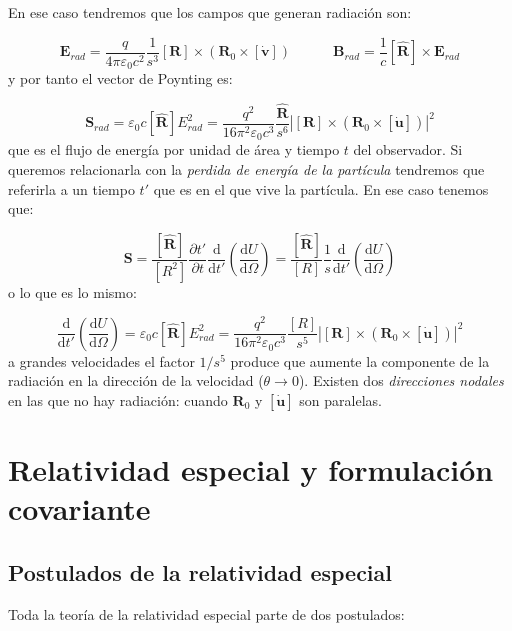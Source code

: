 \documentclass[12pt,a4paper]{article}
\newcommand{\parentesis}[1]{\left( #1  \right)}
\newcommand{\parciales}[2]{\frac{\partial #1}{\partial #2}}
\newcommand{\derivadas}[2]{\frac{\D #1}{\D #2}}
\newcommand{\D}{\mathrm{d}}
\newcommand{\tquad}{\quad \quad \quad}
\newcommand{\Bn}{\mathbf{B}}
\newcommand{\En}{\mathbf{E}}
\newcommand{\vn}{\mathbf{v}}
\newcommand{\Sn}{\mathbf{S}}
\newcommand{\un}{\mathbf{u}}
\newcommand{\Rn}{\mathbf{R}}
\newcommand{\hnR}{\hat{\mathbf{R}}}
\numberwithin{equation}{section}
\numberwithin{figure}{section}
\begin{document}
En ese caso tendremos que los campos que generan radiación son:

\begin{equation}
\En_{rad} = \dfrac{q}{4 \pi \varepsilon_0 c^2 } \dfrac{1}{s^3} [\Rn] \times (\Rn_0 \times [\dot{\vn}] ) \tquad \Bn_{rad} = \dfrac{1}{c} [\hnR] \times \En_{rad}
\end{equation}
y por tanto el vector de Poynting es:

\begin{equation}
\Sn_{rad} = \varepsilon_0 c [\hnR] E^2_{rad} = \dfrac{q^2}{16 \pi^2 \varepsilon_0 c^3} \dfrac{\hnR}{s^6} \left|[{\Rn}]\times(\Rn_0 \times [\dot{\un}]) \right|^2
\end{equation}
que es el flujo de energía por unidad de área y tiempo $t$ del observador. Si queremos relacionarla con la \textit{perdida de energía de la partícula} tendremos que referirla a un tiempo $t'$ que es en el que vive la partícula. En ese caso tenemos que:

\begin{equation}
\Sn = \dfrac{[\hnR]}{[R^2]} \parciales{t'}{t} \dfrac{\D}{\D t'} \parentesis{\derivadas{U}{\Omega}} = \dfrac{[\hnR]}{[R]} \dfrac{1}{s} \dfrac{\D}{\D t'} \parentesis{\derivadas{U}{\Omega}}
\end{equation}
o lo que es lo mismo:

\begin{equation}
\dfrac{\D}{\D t'} \parentesis{\derivadas{U}{\Omega}} = \varepsilon_0 c [\hnR] E^2_{rad} = \dfrac{q^2}{16 \pi^2 \varepsilon_0 c^3} \dfrac{[R]}{s^5} \left|[{\Rn}]\times(\Rn_0 \times [\dot{\un}]) \right|^2
\end{equation}
a grandes velocidades el factor $1/s^5$ produce que aumente la componente de la radiación en la dirección de la velocidad ($\theta \rightarrow 0$). Existen dos \textit{direcciones nodales} en las que no hay radiación: cuando $\Rn_0$ y $[\dot{\un}]$ son paralelas. 



\section{Relatividad especial y formulación covariante}

\subsection{Postulados de la relatividad especial}

Toda la teoría de la relatividad especial parte de dos postulados:
\end{document}
